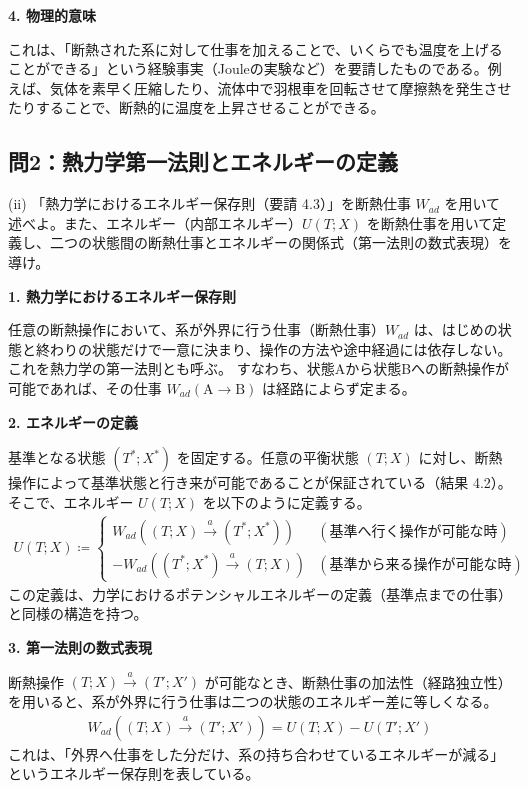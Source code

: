 \documentclass[a4paper,12pt]{jlreq}
\begin{document}
\textbf{4. 物理的意味} \par
これは、「断熱された系に対して仕事を加えることで、いくらでも温度を上げることができる」という経験事実（Jouleの実験など）を要請したものである。例えば、気体を素早く圧縮したり、流体中で羽根車を回転させて摩擦熱を発生させたりすることで、断熱的に温度を上昇させることができる。

\vspace{10mm}

\subsection*{問2：熱力学第一法則とエネルギーの定義}

\begin{itembox}[l]{(ii)}
  「熱力学におけるエネルギー保存則（要請 4.3）」を断熱仕事 $W_{ad}$ を用いて述べよ。また、エネルギー（内部エネルギー）$U(T; X)$ を断熱仕事を用いて定義し、二つの状態間の断熱仕事とエネルギーの関係式（第一法則の数式表現）を導け。
\end{itembox}

\vspace{5mm}

\par
\textbf{1. 熱力学におけるエネルギー保存則} \par
任意の断熱操作において、系が外界に行う仕事（断熱仕事）$W_{ad}$ は、はじめの状態と終わりの状態だけで一意に決まり、操作の方法や途中経過には依存しない。これを熱力学の第一法則とも呼ぶ。
すなわち、状態Aから状態Bへの断熱操作が可能であれば、その仕事 $W_{ad}(\text{A} \to \text{B})$ は経路によらず定まる。

\textbf{2. エネルギーの定義} \par
基準となる状態 $(T^*; X^*)$ を固定する。任意の平衡状態 $(T; X)$ に対し、断熱操作によって基準状態と行き来が可能であることが保証されている（結果 4.2）。そこで、エネルギー $U(T; X)$ を以下のように定義する。
\begin{align}
  U(T; X) \coloneqq
  \begin{cases}
    W_{ad}((T; X) \xrightarrow{a} (T^*; X^*)) & (\text{基準へ行く操作が可能な時}) \\
    -W_{ad}((T^*; X^*) \xrightarrow{a} (T; X)) & (\text{基準から来る操作が可能な時})
  \end{cases}
\end{align}
この定義は、力学におけるポテンシャルエネルギーの定義（基準点までの仕事）と同様の構造を持つ。

\textbf{3. 第一法則の数式表現} \par
断熱操作 $(T; X) \xrightarrow{a} (T'; X')$ が可能なとき、断熱仕事の加法性（経路独立性）を用いると、系が外界に行う仕事は二つの状態のエネルギー差に等しくなる。
\begin{align}
  W_{ad}((T; X) \xrightarrow{a} (T'; X')) = U(T; X) - U(T'; X')
\end{align}
これは、「外界へ仕事をした分だけ、系の持ち合わせているエネルギーが減る」というエネルギー保存則を表している。
\end{document}
